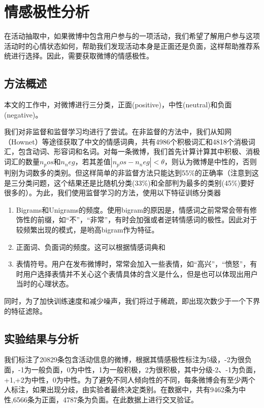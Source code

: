 \section{情感极性分析}
在活动抽取中，如果微博中包含用户参与的一项活动，我们希望了解用户参与这项活动时的心情状态如何，帮助我们发现活动本身是正面还是负面，这样帮助推荐系统进行选择。因此，需要获取微博的情感极性。

\subsection{方法概述}
本文的工作中，对微博进行三分类，正面(positive)，中性(neutral)和负面(negative)。

我们对非监督和监督学习均进行了尝试。在非监督的方法中，我们从知网（Hownet）等途径获取了中文的情感词典，共有4986个积极词汇和4818个消极词汇，包含动词、形容词和名词。对每一条微博，我们首先计算计算其中积极、消极词汇的数量$n_pos$和$n_neg$，若其差值$|n_pos-n_neg|<\theta$，则认为微博是中性的，否则判别为词数多的类别。但这样简单的非监督方法只能达到55\%的正确率（注意到这是三分类问题，这个结果还是比随机分类(33\%)和全部判为最多的类别(45\%)要好很多的）。为此，我们使用监督学习的方法，使用以下特征训练分类器

\begin{enumerate}
\item Bigrams和Unigrams的频度。使用bigram的原因是，情感词之前常常会带有修饰性的前缀，如``不''，``非常''，有时会加强或者逆转情感词的极性。因此对于较频繁出现的模式，是哟高bigram作为特征。
\item 正面词、负面词的频度。这可以根据情感词典和
\item 表情符号。用户在发布微博时，常常会加入一些表情，如``高兴''，``愤怒''，有时用户选择表情并不关心这个表情具体的含义是什么，但是也可以体现出用户当时的心理状态。
\end{enumerate}
同时，为了加快训练速度和减少噪声，我们将过于稀疏，即出现次数少于一个下界的特征滤除。

\subsection{实验结果与分析}

我们标注了20829条包含活动信息的微博，根据其情感极性标注为5级，-2为很负面，-1为一般负面，0为中性，1为一般积极，2为很积极，其中分级-2、-1为负面，+1,+2为中性，0为中性。为了避免不同人倾向性的不同，每条微博会有至少两个人标注，如果出现分歧，由实验者最终决定类别。在数据中，共有9462条为中性,6566条为正面，4787条为负面。在此数据上进行交叉验证。

